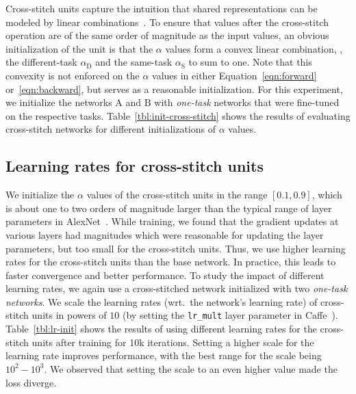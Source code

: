 \documentclass[10pt,twocolumn,letterpaper]{article}
\begin{document}
Cross-stitch units capture the intuition that shared representations can be modeled by linear combinations~\cite{whomToShare}. 
To ensure that values after the cross-stitch operation are of the same order of magnitude as the input values, an obvious initialization of the unit is that the $\alpha$ values form a convex linear combination, \ie, the different-task $\alpha_\mathrm{D}$ and the same-task $\alpha_\mathrm{S}$ to sum to one. Note that this convexity is not enforced on the $\alpha$ values in either Equation~\ref{eqn:forward} or~\ref{eqn:backward}, but serves as a reasonable initialization. For this experiment, we initialize the networks $\mathrm{A}$ and $\mathrm{B}$ with \emph{one-task} networks that were fine-tuned on the respective tasks. Table~\ref{tbl:init-cross-stitch} shows the results of evaluating cross-stitch networks for different initializations of $\alpha$ values.

\subsection{Learning rates for cross-stitch units}
We initialize the $\alpha$ values of the cross-stitch units in the range $[0.1,0.9]$, which is about one to two orders of magnitude larger than the typical range of layer parameters in AlexNet~\cite{alexnet}. While training, we found that the gradient updates at various layers had magnitudes which were reasonable for updating the layer parameters, but too small for the cross-stitch units. Thus, we use higher learning rates for the cross-stitch units than the base network. In practice, this leads to faster convergence and better performance. To study the impact of different learning rates, we again use a cross-stitched network initialized with two \emph{one-task networks}. We scale the learning rates (wrt.\ the network's learning rate) of cross-stitch units in powers of $10$ (by setting the \texttt{lr\_mult} layer parameter in Caffe~\cite{caffe}). Table~\ref{tbl:lr-init} shows the results of using different learning rates for the cross-stitch units after training for 10k iterations. Setting a higher scale for the learning rate improves performance, with the best range for the scale being $10^2 - 10^3$. We observed that setting the scale to an even higher value made the loss diverge.
\end{document}
